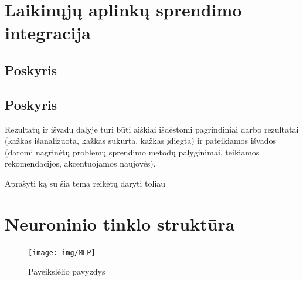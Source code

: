 \documentclass{VUMIFPSkursinis}
\begin{document}

\section{Laikinųjų aplinkų sprendimo integracija}
\subsection{Poskyris}
\subsection{Poskyris}

Rezultatų ir išvadų dalyje turi būti aiškiai išdėstomi pagrindiniai darbo
rezultatai (kažkas išanalizuota, kažkas sukurta, kažkas įdiegta) ir pateikiamos
išvados (daromi nagrinėtų problemų sprendimo metodų palyginimai, teikiamos
rekomendacijos, akcentuojamos naujovės).

Aprašyti ką su šia tema reikėtų daryti toliau

\printbibliography[heading=bibintoc,category=cited] %


\appendix  %

\section{Neuroninio tinklo struktūra}
\begin{figure}[H]
    \centering
    \texttt{[image: img/MLP]}
    \caption{Paveikslėlio pavyzdys}
    \label{img:mlp}
\end{figure}
\end{document}
